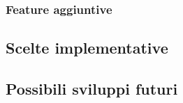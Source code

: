 \documentclass{article}
\begin{document}
\subsubsection*{Feature aggiuntive}

\subsection*{Scelte implementative}


\subsection*{Possibili sviluppi futuri}
\end{document}
